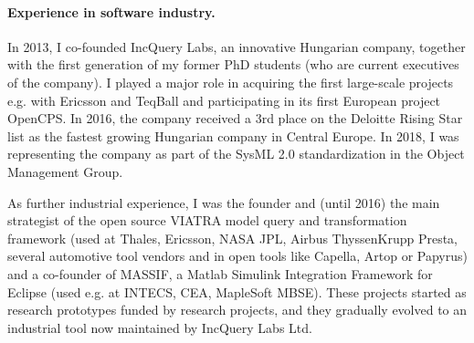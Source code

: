 
\paragraph{Experience in software industry.}
In 2013, I co-founded IncQuery Labs, an innovative Hungarian company, together with the first generation of my former PhD students (who are current executives of the company). I played a major role in acquiring the first large-scale projects e.g. with Ericsson and TeqBall and participating in its first European project OpenCPS. In 2016, the company received a 3rd place on the Deloitte Rising Star list as the fastest growing Hungarian company in Central Europe. In 2018, I was representing the company as part of the SysML 2.0 standardization in the Object Management Group. 

As further industrial experience, I was the founder and (until 2016) the main strategist of the open source VIATRA model query and transformation framework (used at Thales, Ericsson, NASA JPL, Airbus ThyssenKrupp Presta, several automotive tool vendors and in open tools like Capella, Artop or Papyrus) and a co-founder of MASSIF, a Matlab Simulink Integration Framework for Eclipse (used e.g. at INTECS, CEA, MapleSoft MBSE).  These projects started as research prototypes funded by research projects, and they gradually evolved to an industrial tool now maintained by IncQuery Labs Ltd.

